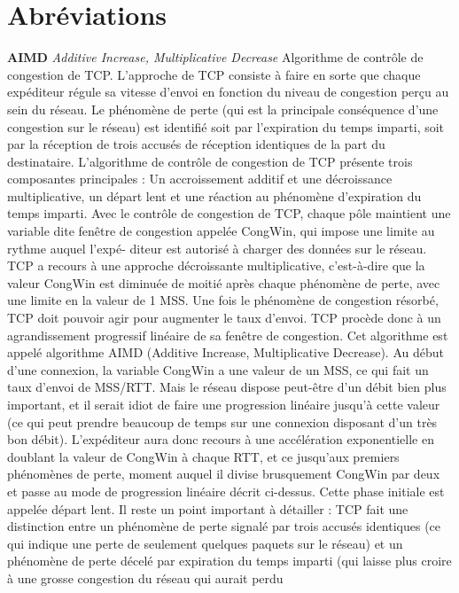 \section{Abréviations}




\textbf{AIMD} \textit{Additive Increase, Multiplicative Decrease} Algorithme de contrôle de congestion de TCP.
L’approche de TCP consiste à faire en sorte que chaque expéditeur régule sa vitesse
d’envoi en fonction du niveau de congestion perçu au sein du réseau. Le phénomène de
perte (qui est la principale conséquence d’une congestion sur le réseau) est identifié soit
par l’expiration du temps imparti, soit par la réception de trois accusés de réception
identiques de la part du destinataire. L’algorithme de contrôle de congestion de TCP
présente trois composantes principales : Un accroissement additif et une décroissance
multiplicative, un départ lent et une réaction au phénomène d’expiration du temps
imparti.
Avec le contrôle de congestion de TCP, chaque pôle maintient une variable dite
fenêtre de congestion appelée CongWin, qui impose une limite au rythme auquel l’expé-
diteur est autorisé à charger des données sur le réseau. TCP a recours à une approche
décroissante multiplicative, c’est-à-dire que la valeur CongWin est diminuée de moitié
après chaque phénomène de perte, avec une limite en la valeur de 1 MSS. Une fois le
phénomène de congestion résorbé, TCP doit pouvoir agir pour augmenter le taux d’envoi.
TCP procède donc à un agrandissement progressif linéaire de sa fenêtre de congestion.
Cet algorithme est appelé algorithme AIMD (Additive Increase, Multiplicative Decrease).
Au début d’une connexion, la variable CongWin a une valeur de un MSS, ce qui fait
un taux d’envoi de MSS/RTT. Mais le réseau dispose peut-être d’un débit bien plus
important, et il serait idiot de faire une progression linéaire jusqu’à cette valeur (ce qui
peut prendre beaucoup de temps sur une connexion disposant d’un très bon débit).
L’expéditeur aura donc recours à une accélération exponentielle en doublant la valeur de
CongWin à chaque RTT, et ce jusqu’aux premiers phénomènes de perte, moment auquel
il divise brusquement CongWin par deux et passe au mode de progression linéaire décrit
ci-dessus. Cette phase initiale est appelée départ lent.
Il reste un point important à détailler : TCP fait une distinction entre un phénomène
de perte signalé par trois accusés identiques (ce qui indique une perte de seulement
quelques paquets sur le réseau) et un phénomène de perte décelé par expiration du
temps imparti (qui laisse plus croire à une grosse congestion du réseau qui aurait perdu
